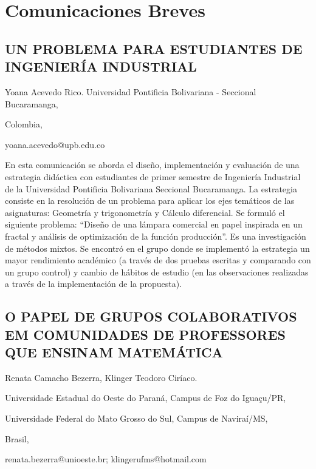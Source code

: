 
\pagestyle{headings}
\nocite{*}
\fontsize{7}{8}\selectfont
\pagecolor{white} 

\onecolumn
\chapter{Comunicaciones Breves } 
\renewcommand\thesection{CB\ \nplpadding{3}\numprint{\arabic{section}}} 
\setcounter{section}{0}
\chaptertoc
\twocolumn
\balance



\section{UN PROBLEMA PARA ESTUDIANTES DE INGENIERÍA INDUSTRIAL }

\begin{datos}

Yoana Acevedo Rico. Universidad Pontificia Bolivariana - Seccional
Bucaramanga,

Colombia,

yoana.acevedo@upb.edu.co 

\end{datos}

En esta comunicación se aborda el diseño, implementación y evaluación
de una estrategia didáctica con estudiantes de primer semestre de
Ingeniería Industrial de la Universidad Pontificia Bolivariana Seccional
Bucaramanga. La estrategia consiste en la resolución de un problema
para aplicar los ejes temáticos de las asignaturas: Geometría y trigonometría
y Cálculo diferencial. Se formuló el siguiente problema: “Diseño de
una lámpara comercial en papel inspirada en un fractal y análisis
de optimización de la función producción”. Es una investigación de
métodos mixtos. Se encontró en el grupo donde se implementó la estrategia
un mayor rendimiento académico (a través de dos pruebas escritas y
comparando con un grupo control) y cambio de hábitos de estudio (en
las observaciones realizadas a través de la implementación de la propuesta).


\section{O PAPEL DE GRUPOS COLABORATIVOS EM COMUNIDADES DE PROFESSORES QUE
ENSINAM MATEMÁTICA}

\begin{datos}

Renata Camacho Bezerra, Klinger Teodoro Ciríaco.

Universidade Estadual do Oeste do Paraná, Campus de Foz do Iguaçu/PR,

Universidade Federal do Mato Grosso do Sul, Campus de Naviraí/MS,

Brasil,

renata.bezerra@unioeste.br; klingerufms@hotmail.com 

\end{datos}


